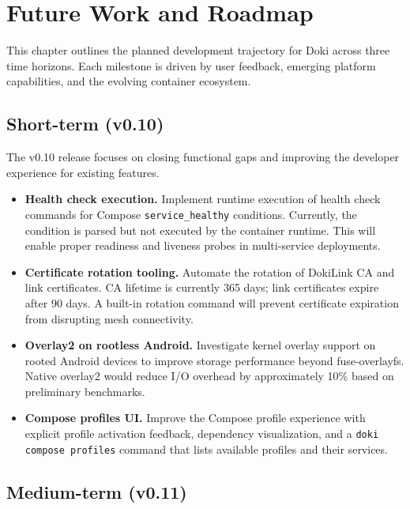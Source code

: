 \chapter{Future Work and Roadmap}
\label{ch:roadmap}

This chapter outlines the planned development trajectory for Doki
across three time horizons. Each milestone is driven by user feedback,
emerging platform capabilities, and the evolving container ecosystem.

\section{Short-term (v0.10)}
\label{sec:roadmap-short}

The v0.10 release focuses on closing functional gaps and improving
the developer experience for existing features.

\begin{itemize}[leftmargin=*, itemsep=4pt]
  \item \textbf{Health check execution.} Implement runtime execution
        of health check commands for Compose \texttt{service\_healthy}
        conditions. Currently, the condition is parsed but not executed
        by the container runtime. This will enable proper readiness and
        liveness probes in multi-service deployments.

  \item \textbf{Certificate rotation tooling.} Automate the rotation
        of DokiLink CA and link certificates. CA lifetime is currently
        365 days; link certificates expire after 90 days. A built-in
        rotation command will prevent certificate expiration from
        disrupting mesh connectivity.

  \item \textbf{Overlay2 on rootless Android.} Investigate kernel
        overlay support on rooted Android devices to improve storage
        performance beyond fuse-overlayfs. Native overlay2 would reduce
        I/O overhead by approximately 10\% based on preliminary
        benchmarks.

  \item \textbf{Compose profiles UI.} Improve the Compose profile
        experience with explicit profile activation feedback,
        dependency visualization, and a \texttt{doki compose profiles}
        command that lists available profiles and their services.
\end{itemize}

\section{Medium-term (v0.11)}
\label{sec:roadmap-medium}

